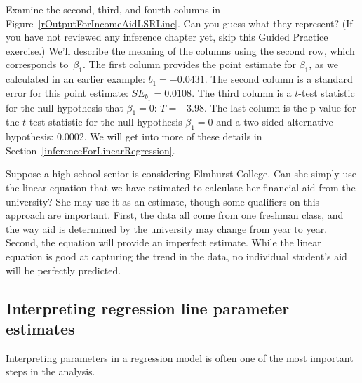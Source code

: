 \begin{examplewrap}
\begin{nexample}{Examine the second, third, and fourth columns
    in Figure~\ref{rOutputForIncomeAidLSRLine}.
    Can you guess what they represent?
    (If you have not reviewed any inference chapter yet,
    skip this Guided Practice exercise.)}
  We'll describe the meaning of the columns using the
  second row, which corresponds to~$\beta_1$.
  The first column provides the point estimate for $\beta_1$,
  as we calculated in an earlier example: $b_1 = -0.0431$.
  The second column is a standard error for this point estimate:
  $SE_{b_1} = 0.0108$.
  The third column is a $t$-test statistic for the null
  hypothesis that $\beta_1 = 0$: $T = -3.98$.
  The last column is the p-value for the $t$-test statistic
  for the null hypothesis $\beta_1 = 0$ and a two-sided
  alternative hypothesis: 0.0002.
  We will get into more of these details in
  Section~\ref{inferenceForLinearRegression}.
\end{nexample}
\end{examplewrap}

\begin{examplewrap}
\begin{nexample}{Suppose a high school senior is considering
    Elmhurst College.
    Can she simply use the linear equation that we have estimated
    to calculate her financial aid from the university?}
  She may use it as an estimate, though some qualifiers on this
  approach are important.
  First, the data all come from one freshman class,
  and the way aid is determined by the university may change
  from year to year.
  Second, the equation will provide an imperfect estimate.
  While the linear equation is good at capturing the trend
  in the data, no individual student's aid will be perfectly
  predicted.
\end{nexample}
\end{examplewrap} 



\subsection{Interpreting regression line parameter estimates}


\noindent%
Interpreting parameters in a regression model is often one
of the most important steps in the analysis.

